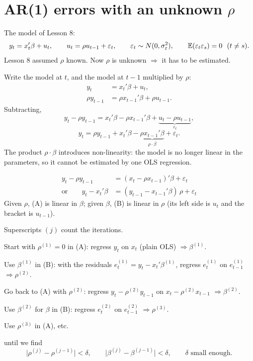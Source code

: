 \documentclass[11pt]{article}
\begin{document}

\section{AR(1) errors with an unknown $\rho$}

The model of Lesson 8:
\[ y_{t} = x_{t}'\beta + u_{t}, \qquad u_{t} = \rho u_{t-1} + \varepsilon_{t}, \qquad
   \varepsilon_{t} \sim N(0, \sigma_{\varepsilon}^{2}), \qquad
   \mathbb{E}(\varepsilon_{t}\varepsilon_{s}) = 0 \ \ (t \neq s). \]
Lesson 8 assumed $\rho$ known. Now $\rho$ is unknown $\Rightarrow$ it has to be estimated.

Write the model at $t$, and the model at $t-1$ multiplied by $\rho$:
\begin{align*}
  y_{t}        &= x_{t}'\beta + u_{t},\\
  \rho y_{t-1} &= \rho x_{t-1}'\beta + \rho u_{t-1}.
\end{align*}
Subtracting,
\[ y_{t} - \rho y_{t-1} = x_{t}'\beta - \rho x_{t-1}'\beta
   + \underbrace{u_{t} - \rho u_{t-1}}_{\varepsilon_{t}}, \]
\[ y_{t} = \rho y_{t-1} + x_{t}'\beta - \underbrace{\rho x_{t-1}'\beta}_{\rho\cdot\beta} + \varepsilon_{t}. \]
The product $\rho\cdot\beta$ introduces non-linearity: the model is no longer linear
in the parameters, so it cannot be estimated by one OLS regression.

\begin{align*}
  y_{t} - \rho y_{t-1} &= (x_{t} - \rho x_{t-1})'\beta + \varepsilon_{t} \tag{A}\\
  \text{or}\qquad y_{t} - x_{t}'\beta &= (y_{t-1} - x_{t-1}'\beta)\,\rho + \varepsilon_{t} \tag{B}
\end{align*}
Given $\rho$, (A) is linear in $\beta$; given $\beta$, (B) is linear in $\rho$
(its left side is $u_{t}$ and the bracket is $u_{t-1}$).

Superscripts $(j)$ count the iterations.
\begin{flatnum}
  \item Start with $\rho^{(1)} = 0$ in (A): regress $y_{t}$ on $x_{t}$ (plain OLS)
        $\Rightarrow \beta^{(1)}$.
  \item Use $\beta^{(1)}$ in (B): with the residuals
        $e_{t}^{(1)} = y_{t} - x_{t}'\beta^{(1)}$, regress $e_{t}^{(1)}$ on
        $e_{t-1}^{(1)}$ $\Rightarrow \rho^{(2)}$.
  \item Go back to (A) with $\rho^{(2)}$: regress $y_{t} - \rho^{(2)}y_{t-1}$ on
        $x_{t} - \rho^{(2)}x_{t-1}$ $\Rightarrow \beta^{(2)}$.
  \item Use $\beta^{(2)}$ for $\beta$ in (B): regress $e_{t}^{(2)}$ on $e_{t-1}^{(2)}$
        $\Rightarrow \rho^{(3)}$.
  \item Use $\rho^{(3)}$ in (A), etc.
\end{flatnum}
until we find
\[ \bigl|\rho^{(j)} - \rho^{(j-1)}\bigr| < \delta, \qquad
   \bigl|\beta^{(j)} - \beta^{(j-1)}\bigr| < \delta, \qquad \delta \text{ small enough}. \]
\end{document}
